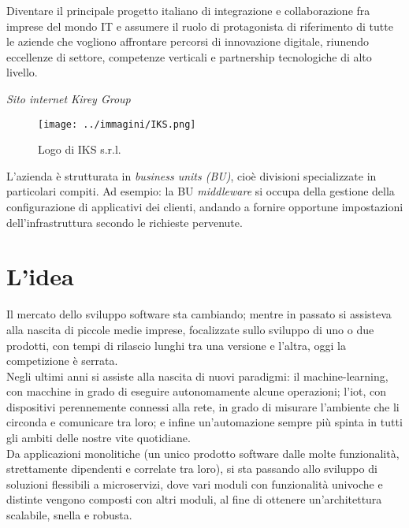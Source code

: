 \begin{shadequote}
    Diventare il principale progetto italiano di integrazione e collaborazione fra imprese del mondo IT e assumere il ruolo di protagonista di riferimento di tutte le aziende che vogliono affrontare percorsi di innovazione digitale, riunendo eccellenze di settore, competenze verticali e partnership tecnologiche di alto livello.\par\emph{Sito internet Kirey Group}
\end{shadequote}


\vspace{2.5em}
\begin{figure}[H]
    \capstart
    \centering
    \texttt{[image: ../immagini/IKS.png]}
    \caption{Logo di IKS s.r.l.}
\end{figure}

L'azienda è strutturata in \textit{business units (BU)}, cioè divisioni specializzate in particolari compiti. Ad esempio: la BU \textit{\gls{middleware}} si occupa della gestione della configurazione di applicativi dei clienti, andando a fornire opportune impostazioni dell'infrastruttura secondo le richieste pervenute.

\section{L'idea}
Il mercato dello sviluppo software sta cambiando; mentre in passato si assisteva alla nascita di piccole medie imprese, focalizzate sullo sviluppo di uno o due prodotti, con tempi di rilascio lunghi tra una versione e l'altra, oggi la competizione è serrata. \\ Negli ultimi anni si assiste alla nascita di nuovi paradigmi: il \gls{machine-learning}, con macchine in grado di eseguire autonomamente alcune operazioni; l'\gls{iot}, con dispositivi perennemente connessi alla rete, in grado di misurare l'ambiente che li circonda e comunicare tra loro; e infine un'automazione sempre più spinta in tutti gli ambiti delle nostre vite quotidiane.\\
Da applicazioni monolitiche (un unico prodotto software dalle molte funzionalità, strettamente dipendenti e correlate tra loro), si sta passando allo sviluppo di soluzioni flessibili a microservizi, dove vari moduli con funzionalità univoche e distinte vengono composti con altri moduli, al fine di ottenere un'architettura scalabile, snella e robusta.\\

